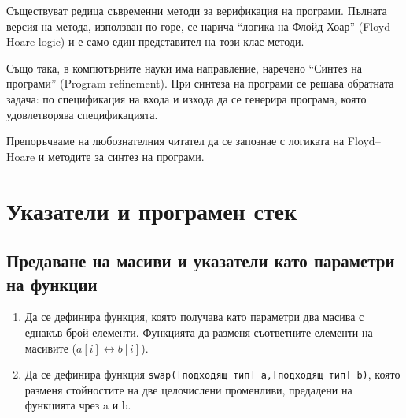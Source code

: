 \documentclass[12pt,a4paper]{article}
\begin{document}
{\begin{enumerate}[resume]
\end{enumerate}

\begin{mdframed}[hidealllines=true,backgroundcolor=gray!20]
Съществуват редица съвременни методи за верификация на програми. Пълната версия на метода, използван по-горе, се нарича ``логика на Флойд-Хоар'' (Floyd–Hoare logic) и е само един представител на този клас методи.

Също така, в компютърните науки има направление, наречено ``Синтез на програми'' (Program refinement). При синтеза на програми се решава обратната задача: по спецификация на входа и изхода да се генерира програма, която удовлетворява спецификацията.

Препоръчваме на любознателния читател да се запознае с логиката на Floyd–Hoare и методите за синтез на програми.
\end{mdframed}

\pagebreak

\section{Указатели и програмен стек}

\subsection {Предаване на масиви и указатели като параметри на функции}
\begin{enumerate}
  \item Да се дефинира функция, която получава като параметри два масива с еднакъв брой елементи. Функцията да разменя съответните елементи на масивите ($a[i] \leftrightarrow b[i]$).
  \item Да се дефинира функция \texttt{swap([подходящ тип] a,[подходящ тип] b)}, която разменя стойностите на две целочислени променливи, предадени на функцията чрез a и b.
\end{enumerate}

}
\end{document}
